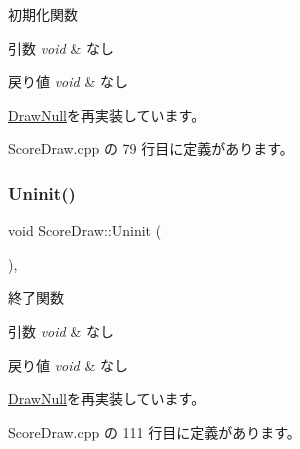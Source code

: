 初期化関数 


\begin{DoxyParams}{引数}
{\em void} & なし \\
\hline
\end{DoxyParams}

\begin{DoxyRetVals}{戻り値}
{\em void} & なし \\
\hline
\end{DoxyRetVals}


\mbox{\hyperlink{class_draw_null_a20aef1e54c1a158b741bfd731e18efdf}{Draw\+Null}}を再実装しています。



 Score\+Draw.\+cpp の 79 行目に定義があります。

\mbox{\label{class_score_draw_aad744f8a7a1202e6ba8117c660f297ee}} 
\subsubsection{\texorpdfstring{Uninit()}{Uninit()}}
{\footnotesize\ttfamily void Score\+Draw\+::\+Uninit (\begin{DoxyParamCaption}{ }\end{DoxyParamCaption})\hspace{0.3cm}{\ttfamily [override]}, {\ttfamily [virtual]}}



終了関数 


\begin{DoxyParams}{引数}
{\em void} & なし \\
\hline
\end{DoxyParams}

\begin{DoxyRetVals}{戻り値}
{\em void} & なし \\
\hline
\end{DoxyRetVals}


\mbox{\hyperlink{class_draw_null_a6e81d63efab7333e8d0e8af99362a4d9}{Draw\+Null}}を再実装しています。



 Score\+Draw.\+cpp の 111 行目に定義があります。

\mbox{\label{class_score_draw_a84fa10dee56f75616d4643b3568daf61}} 
